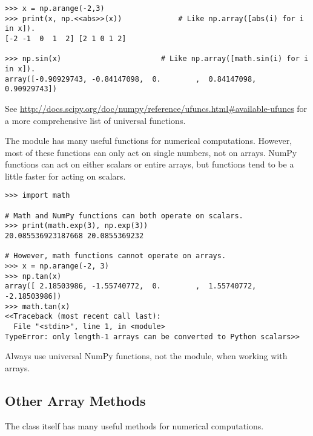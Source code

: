 \begin{lstlisting}
>>> x = np.arange(-2,3)
>>> print(x, np.<<abs>>(x))             # Like np.array([abs(i) for i in x]).
[-2 -1  0  1  2] [2 1 0 1 2]

>>> np.sin(x)                       # Like np.array([math.sin(i) for i in x]).
array([-0.90929743, -0.84147098,  0.        ,  0.84147098,  0.90929743])
\end{lstlisting}

See \url{http://docs.scipy.org/doc/numpy/reference/ufuncs.html#available-ufuncs} for a more comprehensive list of universal functions.

\begin{warn}
The  module has many useful functions for numerical computations.
However, most of these functions can only act on single numbers, not on arrays.
NumPy functions can act on either scalars or entire arrays, but  functions tend to be a little faster for acting on scalars.
\begin{lstlisting}
>>> import math

# Math and NumPy functions can both operate on scalars.
>>> print(math.exp(3), np.exp(3))
20.085536923187668 20.0855369232

# However, math functions cannot operate on arrays.
>>> x = np.arange(-2, 3)
>>> np.tan(x)
array([ 2.18503986, -1.55740772,  0.        ,  1.55740772, -2.18503986])
>>> math.tan(x)
<<Traceback (most recent call last):
  File "<stdin>", line 1, in <module>
TypeError: only length-1 arrays can be converted to Python scalars>>
\end{lstlisting}
Always use universal NumPy functions, not the  module, when working with arrays.
\end{warn}

\subsection*{Other Array Methods} %

The  class itself has many useful methods for numerical computations.


